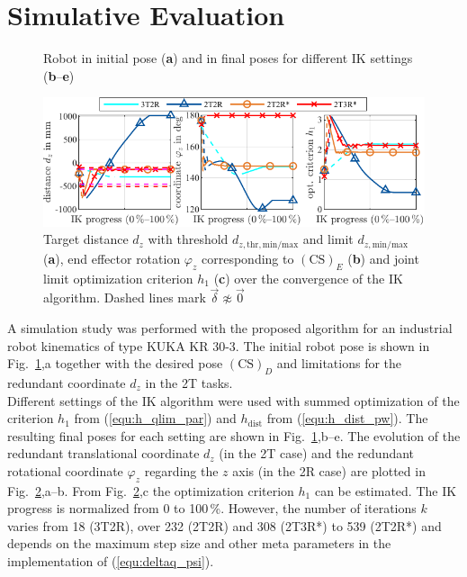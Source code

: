 \documentclass[graybox,vecphys]{svmult}
\newcommand{\ks}[1]{{(\mathrm{CS})_{#1}}}
\newcommand{\Res}[0]{\vec{\delta}}
\begin{document}
\section{Simulative Evaluation}
\label{sec:simulation}


\begin{figure}[b]
\centering

\caption{Robot in initial pose (\textbf{a}) and in final poses for different IK settings (\textbf{b}--\textbf{e})}
\label{fig:robots_ik_results}
\end{figure}

\begin{figure}[b]
\begin{center}
\includegraphics[]{figures/ik_results.pdf}
\caption{Target distance $d_z$ with threshold $d_{z,\mathrm{thr,min/max}}$ and limit $d_{z,\mathrm{min/max}}$ (\textbf{a}), end effector rotation $\varphi_z$ corresponding to $\ks{E}$ (\textbf{b}) and joint limit optimization criterion $h_1$ (\textbf{c}) over the convergence of the IK algorithm. Dashed lines mark $\Res \napprox \vec{0}$}
\label{fig:ik_results}
\end{center}
\end{figure}


A simulation study was performed with the proposed algorithm for an industrial robot kinematics of type KUKA KR 30-3.
The initial robot pose is shown in Fig.~\ref{fig:robots_ik_results},a together with the desired pose $\ks{D}$ and limitations for the redundant coordinate $d_z$ in the 2T tasks. \\
Different settings of the IK algorithm were used with summed optimization of the criterion $h_1$ from (\ref{equ:h_qlim_par}) and $h_\mathrm{dist}$ from (\ref{equ:h_dist_pw}).
The resulting final poses for each setting are shown in Fig.~\ref{fig:robots_ik_results},b--e.
The evolution of the redundant translational coordinate $d_z$ (in the 2T case) and the redundant rotational coordinate $\varphi_z$ regarding the $z$ axis (in the 2R case) are plotted in Fig.~\ref{fig:ik_results},a--b.
From Fig.~\ref{fig:ik_results},c the optimization criterion $h_1$ can be estimated.
The IK progress is normalized from 0 to 100\,\%.
However, the number of iterations $k$ varies from 18 (3T2R), over 232 (2T2R) and 308 (2T3R*) to 539 (2T2R*) and depends on the maximum step size and other meta parameters in the implementation of (\ref{equ:deltaq_psi}).
\end{document}
